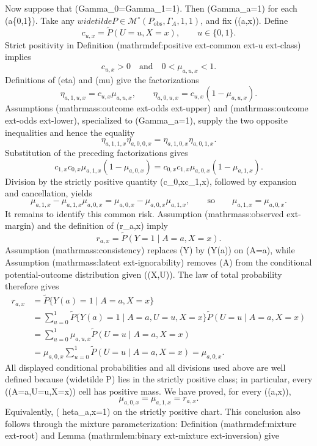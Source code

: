 Now suppose that (Gamma_0=Gamma_1=1).  Then (Gamma_a=1) for each (a\in\{0,1\}).  Take any
\(widetilde P\in\mathcal M^{\circ}(P_{\mathrm{obs}},\Gamma_A,1,1)\), and fix ((a,x)).  Define
\[
c_{u,x}=\widetilde P(U=u,X=x),
\qquad u\in\{0,1\}.
\]
Strict positivity in Definition (mathrm{def{:}positive	ext{-}common	ext{-}u	ext{-}class}) implies
\[
c_{u,x}>0
\quad\text{and}\quad
0<\mu_{a,u,x}<1.
\]
Definitions of (eta) and (mu) give the factorizations
\[
\eta_{a,1,u,x}=c_{u,x}\mu_{a,u,x},
\qquad
\eta_{a,0,u,x}=c_{u,x}(1-\mu_{a,u,x}).
\]
Assumptions (mathrm{ass{:}outcome	ext{-}odds	ext{-}upper}) and (mathrm{ass{:}outcome	ext{-}odds	ext{-}lower}), specialized to (Gamma_a=1), supply the two opposite inequalities and hence the equality
\[
\eta_{a,1,1,x}\eta_{a,0,0,x}
=\eta_{a,1,0,x}\eta_{a,0,1,x}.
\]
Substitution of the preceding factorizations gives
\[
c_{1,x}c_{0,x}\mu_{a,1,x}(1-\mu_{a,0,x})
=c_{0,x}c_{1,x}\mu_{a,0,x}(1-\mu_{a,1,x}).
\]
Division by the strictly positive quantity (c_{0,x}c_{1,x}), followed by expansion and cancellation, yields
\[
\mu_{a,1,x}-\mu_{a,1,x}\mu_{a,0,x}
=\mu_{a,0,x}-\mu_{a,0,x}\mu_{a,1,x},
\qquad\text{so}\qquad
\mu_{a,1,x}=\mu_{a,0,x}.
\]
It remains to identify this common risk.  Assumption (mathrm{ass{:}observed	ext{-}margin}) and the definition of (r_{a,x}) imply
\[
r_{a,x}=\widetilde P(Y=1\mid A=a,X=x).
\]
Assumption (mathrm{ass{:}consistency}) replaces (Y) by (Y(a)) on ({A=a}), while Assumption (mathrm{ass{:}latent	ext{-}ignorability}) removes (A) from the conditional potential-outcome distribution given ((X,U)).  The law of total probability therefore gives
\[
\begin{aligned}
r_{a,x}
&=\widetilde P\{Y(a)=1\mid A=a,X=x\}\\
&=\sum_{u=0}^1
  \widetilde P\{Y(a)=1\mid A=a,U=u,X=x\}
  \widetilde P(U=u\mid A=a,X=x)\\
&=\sum_{u=0}^1
  \mu_{a,u,x}\widetilde P(U=u\mid A=a,X=x)\\
&=\mu_{a,0,x}\sum_{u=0}^1
  \widetilde P(U=u\mid A=a,X=x)
=\mu_{a,0,x}.
\end{aligned}
\]
All displayed conditional probabilities and all divisions used above are well defined because (widetilde P) lies in the strictly positive class; in particular, every ((A=a,U=u,X=x)) cell has positive mass.  We have proved, for every ((a,x)),
\[
\mu_{a,0,x}=\mu_{a,1,x}=r_{a,x}.
\]
Equivalently, (	heta_{a,x}=1) on the strictly positive chart.  This conclusion also follows through the mixture parameterization: Definition (mathrm{def{:}mixture	ext{-}root}) and Lemma (mathrm{lem{:}binary	ext{-}mixture	ext{-}inversion}) give
